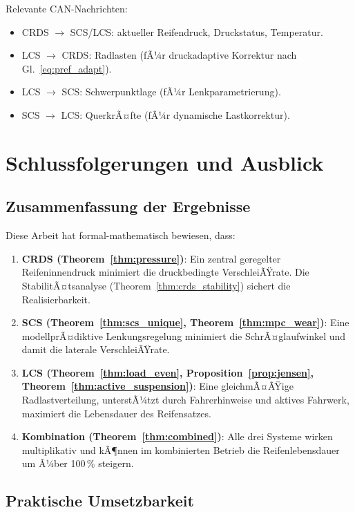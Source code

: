 ﻿\documentclass[12pt,a4paper]{article}
\theoremstyle{definition}
\theoremstyle{remark}
\begin{document}
Relevante CAN-Nachrichten:
\begin{itemize}
  \item CRDS $\to$ SCS/LCS: aktueller Reifendruck, Druckstatus, Temperatur.
  \item LCS $\to$ CRDS: Radlasten (fÃ¼r druckadaptive Korrektur nach Gl.~\eqref{eq:pref_adapt}).
  \item LCS $\to$ SCS: Schwerpunktlage (fÃ¼r Lenkparametrierung).
  \item SCS $\to$ LCS: QuerkrÃ¤fte (fÃ¼r dynamische Lastkorrektur).
\end{itemize}

\section{Schlussfolgerungen und Ausblick}
\label{sec:schluss}

\subsection{Zusammenfassung der Ergebnisse}

Diese Arbeit hat formal-mathematisch bewiesen, dass:

\begin{enumerate}
  \item \textbf{CRDS (Theorem~\ref{thm:pressure})}: Ein zentral geregelter
        Reifeninnendruck minimiert die druckbedingte VerschleiÃŸrate.
        Die StabilitÃ¤tsanalyse (Theorem~\ref{thm:crds_stability}) sichert
        die Realisierbarkeit.
  \item \textbf{SCS (Theorem~\ref{thm:scs_unique}, Theorem~\ref{thm:mpc_wear})}:
        Eine modellprÃ¤diktive Lenkungsregelung minimiert die SchrÃ¤glaufwinkel
        und damit die laterale VerschleiÃŸrate.
  \item \textbf{LCS (Theorem~\ref{thm:load_even}, Proposition~\ref{prop:jensen},
        Theorem~\ref{thm:active_suspension})}: Eine gleichmÃ¤ÃŸige Radlastverteilung,
        unterstÃ¼tzt durch Fahrerhinweise und aktives Fahrwerk, maximiert die
        Lebensdauer des Reifensatzes.
  \item \textbf{Kombination (Theorem~\ref{thm:combined})}: Alle drei Systeme
        wirken multiplikativ und kÃ¶nnen im kombinierten Betrieb die Reifenlebensdauer
        um Ã¼ber 100\,\% steigern.
\end{enumerate}

\subsection{Praktische Umsetzbarkeit}
\end{document}
